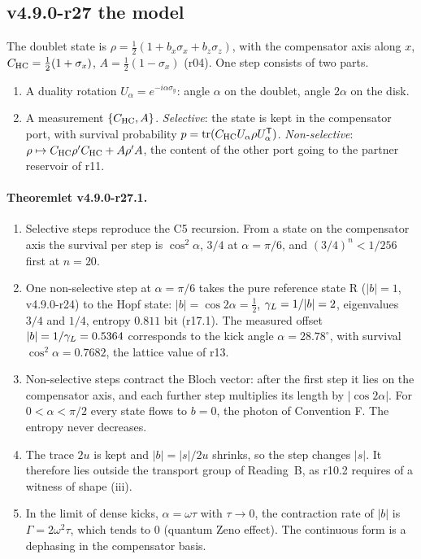 \subsection*{v4.9.0-r27 the model}
\label{subsec:v490-r27-model}

The doublet state is \(\rho=\tfrac12(1+b_x\sigma_x+b_z\sigma_z)\), with the compensator axis along \(x\), \(C_{\mathrm{HC}}=\tfrac12(1+\sigma_x)\),
\(A=\tfrac12(1-\sigma_x)\) (r04).  One step consists of two parts.
\begin{enumerate}[leftmargin=2em]
\item A duality rotation \(U_\alpha=e^{-i\alpha\sigma_y}\): angle \(\alpha\) on the doublet, angle \(2\alpha\) on the disk.
\item A measurement \(\{C_{\mathrm{HC}},A\}\).  \emph{Selective}: the state is kept in the compensator port, with survival probability
\(p=\operatorname{tr}(C_{\mathrm{HC}}U_\alpha\rho U_\alpha^{\mathsf T})\).  \emph{Non-selective}: \(\rho\mapsto C_{\mathrm{HC}}\rho'C_{\mathrm{HC}}+A\rho'A\), the
content of the other port going to the partner reservoir of r11.
\end{enumerate}

\paragraph{Theoremlet v4.9.0-r27.1.}
\begin{enumerate}[leftmargin=2em]
\item[(a)] Selective steps reproduce the C5 recursion.  From a state on the compensator axis the survival per step is \(\cos^2\alpha\),
\(3/4\) at \(\alpha=\pi/6\), and \((3/4)^n<1/256\) first at \(n=20\).
\item[(b)] One non-selective step at \(\alpha=\pi/6\) takes the pure reference state R (\(|b|=1\), v4.9.0-r24) to the Hopf state:
\(|b|=\cos2\alpha=\tfrac12\), \(\gamma_L=1/|b|=2\), eigenvalues \(3/4\) and \(1/4\), entropy \(0.811\) bit (r17.1).  The measured offset
\(|b|=1/\gamma_L=0.5364\) corresponds to the kick angle \(\alpha=28.78^\circ\), with survival \(\cos^2\alpha=0.7682\), the lattice value of r13.
\item[(c)] Non-selective steps contract the Bloch vector: after the first step it lies on the compensator axis, and each further
step multiplies its length by \(|\cos2\alpha|\).  For \(0<\alpha<\pi/2\) every state flows to \(b=0\), the photon of Convention F.  The
entropy never decreases.
\item[(d)] The trace \(2u\) is kept and \(|b|=|s|/2u\) shrinks, so the step changes \(|s|\).  It therefore lies outside the transport
group of Reading~B, as r10.2 requires of a witness of shape (iii).
\item[(e)] In the limit of dense kicks, \(\alpha=\omega\tau\) with \(\tau\to0\), the contraction rate of \(|b|\) is
\(\Gamma=2\omega^2\tau\), which tends to \(0\) (quantum Zeno effect).  The continuous form is a dephasing in the compensator basis.
\end{enumerate}

